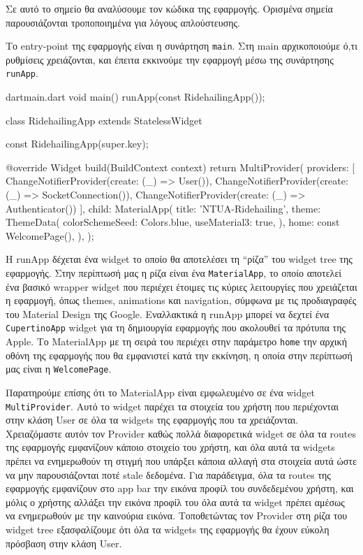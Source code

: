 \documentclass[../thesis.tex]{subfiles}
\begin{document}
Σε αυτό το σημείο θα αναλύσουμε τον κώδικα της εφαρμογής.
Ορισμένα σημεία παρουσιάζονται τροποποιημένα για λόγους απλούστευσης.

\medskip

Το entry-point της εφαρμογής είναι η συνάρτηση \texttt{main}.
Στη main αρχικοποιούμε ό,τι ρυθμίσεις χρειάζονται, και έπειτα εκκινούμε την εφαρμογή μέσω της συνάρτησης \texttt{runApp}.

\begin{codeblock}{dart}{main.dart}
  void main() {
    runApp(const RidehailingApp());
  }
  
  class RidehailingApp extends StatelessWidget {
    const RidehailingApp({super.key});

    @override
    Widget build(BuildContext context) {
      return MultiProvider(
        providers: [
          ChangeNotifierProvider(create: (_) => User()),
          ChangeNotifierProvider(create: (_) => SocketConnection()),
          ChangeNotifierProvider(create: (_) => Authenticator())
        ],
        child: MaterialApp(
          title: 'NTUA-Ridehailing',
          theme: ThemeData(
            colorSchemeSeed: Colors.blue,
            useMaterial3: true,
          ),
          home: const WelcomePage(),
        ),
      );
    }
  }
\end{codeblock}

Η runApp δέχεται ένα widget το οποίο θα αποτελέσει τη ``ρίζα'' του widget tree της εφαρμογής.
Στην περίπτωσή μας η ρίζα είναι ένα \texttt{MaterialApp}, το οποίο αποτελεί ένα βασικό wrapper widget που περιέχει έτοιμες τις κύριες λειτουργίες που χρειάζεται η εφαρμογή, όπως themes, animations και navigation, σύμφωνα με τις προδιαγραφές του Material Design της Google.
Εναλλακτικά η runApp μπορεί να δεχτεί ένα \texttt{CupertinoApp} widget για τη δημιουργία εφαρμογής που ακολουθεί τα πρότυπα της Apple.
Το MaterialApp με τη σειρά του περιέχει στην παράμετρο \texttt{home} την αρχική οθόνη της εφαρμογής που θα εμφανιστεί κατά την εκκίνηση, η οποία στην περίπτωσή μας είναι η \texttt{WelcomePage}.

Παρατηρούμε επίσης ότι το MaterialApp είναι εμφωλευμένο σε ένα widget \texttt{Multi\-Provider}.
Αυτό το widget παρέχει τα στοιχεία του χρήστη που περιέχονται στην κλάση User σε όλα τα widgets της εφαρμογής που τα χρειάζονται.
Χρειαζόμαστε αυτόν τον Provider καθώς πολλά διαφορετικά widget σε όλα τα routes της εφαρμογής εμφανίζουν κάποιο στοιχείο του χρήστη, και όλα αυτά τα widgets πρέπει να ενημερωθούν τη στιγμή που υπάρξει κάποια αλλαγή στα στοιχεία αυτά ώστε να μην παρουσιάζονται ποτέ stale δεδομένα.
Για παράδειγμα, όλα τα routes της εφαρμογής εμφανίζουν στο app bar την εικόνα προφίλ του συνδεδεμένου χρήστη, και μόλις ο χρήστης αλλάξει την εικόνα προφίλ του όλα αυτά τα widget πρέπει αμέσως να ενημερωθούν με την καινούρια εικόνα.
Τοποθετώντας τον Provider στη ρίζα του widget tree εξασφαλίζουμε ότι όλα τα widgets της εφαρμογής θα έχουν εύκολη πρόσβαση στην κλάση User.
\end{document}
